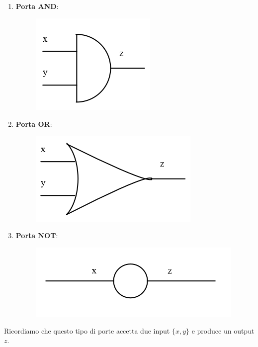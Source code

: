 \documentclass{article}
\begin{document}
\begin{enumerate}

    \item \textbf{Porta AND}:
        \begin{figure}[htbp]
            \center
            \includegraphics[scale=0.45]{img/portaAND.png}
        \end{figure}

    \item \textbf{Porta OR}:
        \begin{figure}[htbp]
            \center
            \includegraphics[scale=0.45]{img/portaOR.png}
        \end{figure}

    \item \textbf{Porta NOT}:
        \begin{figure}[htbp]
            \center
            \includegraphics[scale=0.45]{img/portaNOT.png}
        \end{figure}    

\end{enumerate}

Ricordiamo che questo tipo di porte accetta due input $ \{ x,y \} $ e produce un output $z$.
\end{document}
